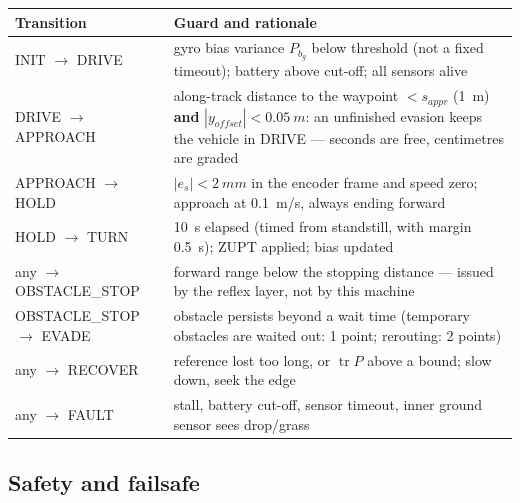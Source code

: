 \documentclass[11pt,a4paper]{article}
\begin{document}
\begin{center}
\small
\begin{tabularx}{\textwidth}{@{}lL@{}}
\toprule
\textbf{Transition} & \textbf{Guard and rationale}\\
\midrule
INIT $\to$ DRIVE & gyro bias variance $P_{b_g}$ below threshold (not a fixed timeout); battery above cut-off; all sensors alive\\
DRIVE $\to$ APPROACH & along-track distance to the waypoint $<s_{appr}$ (\qty{1}{m}) \textbf{and} $|y_{offset}|<\qty{0.05}{m}$: an unfinished evasion keeps the vehicle in DRIVE --- seconds are free, centimetres are graded\\
APPROACH $\to$ HOLD & $|e_s|<\qty{2}{mm}$ in the encoder frame and speed zero; approach at \qty{0.1}{m/s}, always ending forward\\
HOLD $\to$ TURN & \qty{10}{s} elapsed (timed from standstill, with margin \qty{0.5}{s}); ZUPT applied; bias updated\\
any $\to$ OBSTACLE\_STOP & forward range below the stopping distance --- issued by the reflex layer, not by this machine\\
OBSTACLE\_STOP $\to$ EVADE & obstacle persists beyond a wait time (temporary obstacles are waited out: 1 point; rerouting: 2 points)\\
any $\to$ RECOVER & reference lost too long, or $\operatorname{tr}P$ above a bound; slow down, seek the edge\\
any $\to$ FAULT & stall, battery cut-off, sensor timeout, inner ground sensor sees drop/grass\\
\bottomrule
\end{tabularx}
\end{center}

\subsection{Safety and failsafe}\label{sec:safety}
\end{document}
